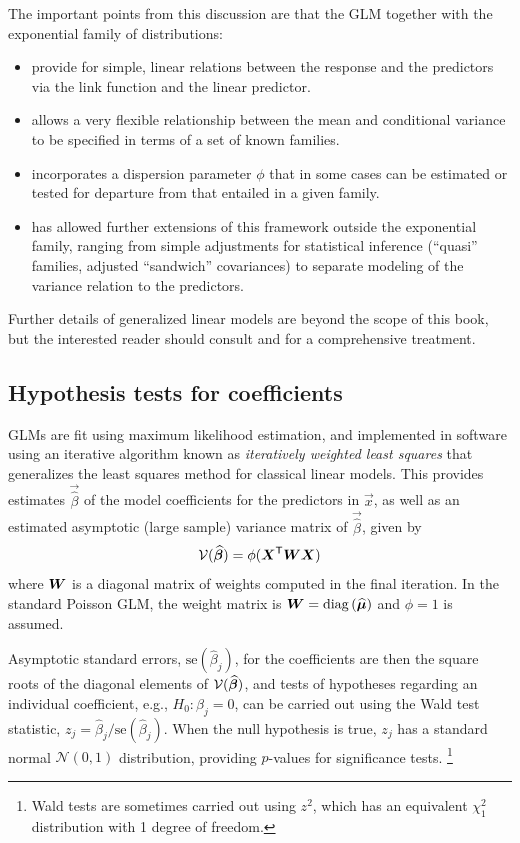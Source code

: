 \documentclass[11pt]{book}\usepackage[]{graphicx}\usepackage[]{color}
\begin{document}
The important points from this discussion are that the GLM together with the exponential
family of distributions:
\begin{itemize}
 \item provide for simple, linear relations between the response and the predictors
 via the link function and the linear predictor.
 \item allows a very flexible relationship between the mean and 
 conditional variance to be specified in terms of a set of known families.
 \item incorporates a dispersion parameter $\phi$ that in some cases can be estimated
 or tested for departure from that entailed in a given family.
 \item has allowed further extensions of this framework outside the exponential family,
 ranging from simple adjustments for statistical inference (``quasi'' families, 
 adjusted ``sandwich'' covariances) to separate modeling of the variance relation
 to the predictors.
\end{itemize}

Further details of generalized linear models are beyond the scope of this book, but
the interested reader should consult \citet[\S 15.3]{Fox:2008} 
and \citet[Ch. 4]{Agresti:2013} for a comprehensive
treatment.

\subsection{Hypothesis tests for coefficients}\label{sec:glm-hyptests}
GLMs are fit using maximum likelihood estimation, and implemented in software using
an iterative algorithm known as \emph{iteratively weighted least squares}
that generalizes the least squares method for classical linear models.
This provides estimates $\vec{\widehat{\beta}}$ of the model coefficients
for the predictors in $\vec{x}$, as well as an estimated asymptotic 
(large sample) variance matrix of $\vec{\widehat{\beta}}$, given by
\begin{equation}\label{eq:varbeta}
\mathcal{V} (\widehat{\bm{\beta}}) = \phi ( \bm{X}^\mathsf{T}  \bm{W} \bm{X} )
\end{equation}
where $\bm{W}$ is a diagonal matrix of weights computed in the final iteration.
In the standard Poisson GLM, the weight matrix is $\bm{W} = \mathrm{diag}\, (\widehat{\bm{\mu}})$
and $\phi=1$ is assumed.

Asymptotic standard errors, $ \mathrm{se} (\widehat{\beta}_j)$,
for the coefficients are then the square roots of the
diagonal elements
of $\mathcal{V} (\widehat{\bm{\beta}})$, and tests of hypotheses regarding
an individual coefficient, e.g., $H_0 : \beta_j = 0$, can be carried out
using the Wald test statistic,
$z_j = \widehat{\beta}_j / \mathrm{se} (\widehat{\beta}_j)$.
When the null hypothesis is true, $z_j$ has a standard normal $\mathcal{N}(0,1)$
distribution, providing $p$-values for significance tests.%
\footnote{Wald tests are sometimes carried out using $z^2$, which has an equivalent
$\chi^2_1$ distribution with 1 degree of freedom.
}
\end{document}
